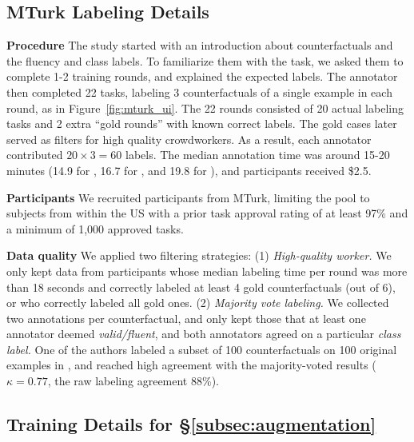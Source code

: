 \subsection{MTurk Labeling Details}
\label{appendix:label_instruct}


\textbf{Procedure}
The study started with an introduction about counterfactuals and the fluency and class labels.
To familiarize them with the task, we asked them to complete 1-2 training rounds, and explained the expected labels.
The annotator then completed 22 tasks, labeling 3 counterfactuals of a single example in each round, as in Figure~\ref{fig:mturk_ui}.
The 22 rounds consisted of 20 actual labeling tasks and 2 extra ``gold rounds'' with known correct labels.
The gold cases later served as filters for high quality crowdworkers.
As a result, each annotator contributed $20 \times 3=60$ labels.
The median annotation time was around 15-20 minutes (14.9 for \qqp, 16.7 for \sst, and 19.8 for \nli), and participants received \$2.5.

\textbf{Participants}
We recruited participants from MTurk, limiting the pool to subjects from within the US with a prior task approval rating of at least 97\% and a minimum of 1,000 approved tasks.

\textbf{Data quality}
We applied two filtering strategies: 
(1) \emph{High-quality worker.} 
We only kept data from participants whose median labeling time per round was more than 18 seconds and correctly labeled at least 4 gold counterfactuals (out of 6), or who correctly labeled all gold ones.
(2) \emph{Majority vote labeling.}
We collected two annotations per counterfactual, and only kept those that at least one annotator deemed \emph{valid/fluent}, and both annotators agreed on a particular \emph{class label.}
One of the authors labeled a subset of 100 counterfactuals on 100 original examples in \sst, and reached high agreement with the majority-voted results ($\kappa=0.77$, the raw labeling agreement $88\%$).


\subsection{Training Details for \S\ref{subsec:augmentation}}
\label{appendix:data_collection}

